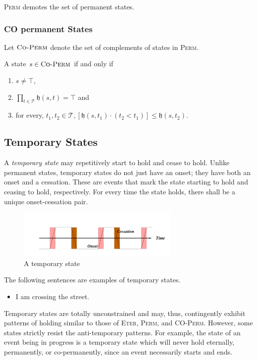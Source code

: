 \textsc{Perm} demotes the set of permanent states.

\subsubsection{CO permanent States}
Let $\textsc{Co-Perm}$ denote the set of complements of states in \textsc{Perm}.

A state $s \in \textsc{Co-Perm}$ if and only if
\begin{enumerate}
  \item $s \neq \top$,
  \item $\displaystyle \prod_{t \in \mathcal{T}} \mathfrak{h}(s, t) = \top$ and
  \item for every, $t_1, t_2 \in \mathcal{T}, [\mathfrak{h}(s, t_1) \cdot (t_2 < t_1)] \leq \mathfrak{h}(s, t_2)$.
\end{enumerate}


\subsection{Temporary States}
A \textit{temporary state} may repetitively start to hold and cease to hold. Unlike
permanent states, temporary states do not just have an onset; they have both an onset and a cessation.
These are events that mark the state starting to hold and ceasing to hold, respectively. For every time
the state holds, there shall be a unique onset-cessation pair.

\begin{figure}[H]
  \centering
  \includegraphics[width=0.7\textwidth]{images/temp-states.png}
  \caption{A temporary state}
  \label{fig:temporary}
\end{figure}

The following sentences are examples of temporary states.

\begin{itemize}
  \item I am crossing the street.
\end{itemize}

Temporary states are totally unconstrained and may, thus,
contingently exhibit patterns of holding similar to those of \textsc{Eter}, \textsc{Perm}, and \textsc{CO-Perm}. However, some states strictly
resist the anti-temporary patterns. For example, the state of
an event being in progress is a temporary state which will
never hold eternally, permanently, or co-permanently, since
an event necessarily starts and ends.

